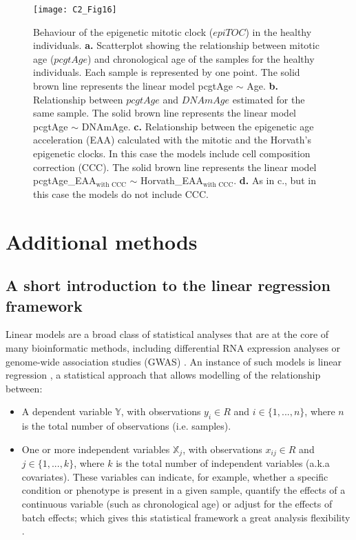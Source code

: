 \begin{figure}[htbp!] 
	\centering
	\texttt{[image: C2\_Fig16]}
	\vspace*{2mm}    
	\caption[Behaviour of the epigenetic mitotic clock ($epiTOC$) in the healthy individuals]{Behaviour of the epigenetic mitotic clock ($epiTOC$) in the healthy individuals. \textbf{a.} Scatterplot showing the relationship between mitotic age ($pcgtAge$) \cite{Yang2016} and chronological age of the samples for the healthy individuals. Each sample is represented by one point. The solid brown line represents the linear model pcgtAge $\sim$ Age. \textbf{b.} Relationship between $pcgtAge$ and $DNAmAge$ estimated for the same sample. The solid brown line represents the linear model pcgtAge $\sim$ DNAmAge. \textbf{c.} Relationship between the epigenetic age acceleration (EAA) calculated with the mitotic and the Horvath's epigenetic clocks. In this case the models include cell composition correction (CCC). The solid brown line represents the linear model pcgtAge\_EAA$_{\text{with CCC}}$ $\sim$ Horvath\_EAA$_{\text{with CCC}}$. \textbf{d.} As in c., but in this case the models do not include CCC.}
	\label{fig:c2_fig16}
\end{figure}


\section{Additional methods} \label{s:2.4}

\subsection*{A short introduction to the linear regression framework}

Linear models are a broad class of statistical analyses that are at the core of many bioinformatic methods, including differential RNA expression analyses \cite{Ritchie2015} or genome-wide association studies (GWAS) \cite{Visscher2017}. An instance of such models is linear regression \cite{Eaton2007}, a statistical approach that allows modelling of the relationship between:

\begin{itemize}
	
	\item A dependent variable $\mathbb Y$, with observations $y_i \in R$ and $i \in \{1, ..., n\}$, where $n$ is the total number of observations (i.e. samples). 
	
	\item One or more independent variables $\mathbb X_j$, with observations $x_{ij} \in R$ and $j \in \{1, ..., k\}$, where $k$ is the total number of independent variables (a.k.a covariates). These variables can indicate, for example, whether a specific condition or phenotype is present in a given sample, quantify the effects of a continuous variable (such as chronological age) or adjust for the effects of batch effects; which gives this statistical framework a great analysis flexibility \cite{Ritchie2015}.
	
\end{itemize}

